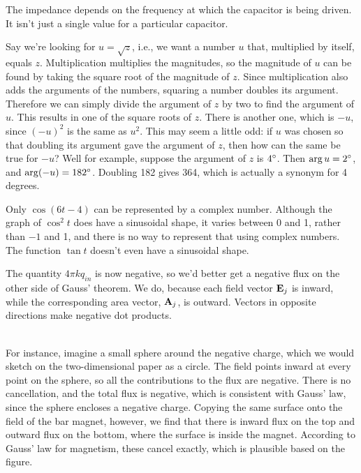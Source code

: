 The impedance depends on the frequency at which the capacitor is being
driven. It isn't just a single value for a particular capacitor.

Say we're looking for $u=\sqrt{z}$, i.e., we want a number $u$ that, multiplied by
itself, equals $z$.
Multiplication multiplies the magnitudes, so
the magnitude of $u$ can be found by taking the square root of the magnitude of $z$.
Since multiplication also adds the arguments of the numbers, squaring a number
doubles its argument. Therefore
we can simply divide the argument of $z$ by two to find the argument of
$u$. This results in one of the square roots of $z$. There is another one, which
is $-u$, since $(-u)^2$ is the same as $u^2$.
This may seem a little odd: if $u$ was chosen so that doubling its
argument gave the argument of $z$, then how can the same be true for $-u$?
Well for example, suppose the argument of $z$ is $4\mspace{0mu}^\circ$. Then $\arg u=2\mspace{0mu}^\circ$,
and $\arg(-u)=182\mspace{0mu}^\circ$. Doubling 182 gives 364, which is actually a synonym for
4 degrees.

 Only $\cos(6t-4)$ can be represented by a complex
number. Although the graph of $\cos^2t$ does have a sinusoidal shape, it varies
between 0 and 1, rather than $-1$ and 1, and there is no way to represent that
using complex numbers. The function $\tan t$ doesn't even have a sinusoidal shape.

The quantity $4\pi kq_{in}$ is now negative, so we'd better
get a negative flux on the other side of Gauss' theorem. We do, because
each field vector $\textbf{E}_j$ is inward, while the corresponding area vector,
$\textbf{A}_j$, is outward. Vectors in opposite directions make negative dot products.

\noindent{}\\
 For instance, imagine a small sphere around the negative charge,
which we would sketch on the two-dimensional paper as a circle. The field points
inward at every point on the sphere, so all the contributions to the flux are negative.
There is no cancellation, and the total flux is negative, which is consistent with
Gauss' law, since the sphere encloses a negative charge. Copying the same surface onto
the field of the bar magnet, however, we find that there is inward flux on the top
and outward flux on the bottom, where the surface is inside the magnet. According to
Gauss' law for magnetism, these cancel exactly, which is plausible based on the figure.

